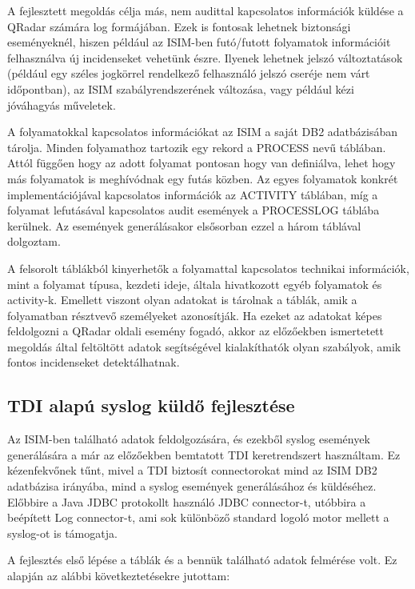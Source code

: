 A fejlesztett megoldás célja más, nem audittal kapcsolatos információk küldése a QRadar számára log formájában. Ezek is fontosak lehetnek biztonsági eseményeknél, hiszen például az ISIM-ben futó/futott folyamatok információit felhasználva új incidenseket vehetünk észre. Ilyenek lehetnek jelszó változtatások (például egy széles jogkörrel rendelkező felhasználó jelszó cseréje nem várt időpontban), az ISIM szabályrendszerének változása, vagy például kézi jóváhagyás műveletek. 

A folyamatokkal kapcsolatos információkat az ISIM a saját DB2 adatbázisában tárolja. Minden folyamathoz tartozik egy rekord a PROCESS nevű táblában. Attól függően hogy az adott folyamat pontosan hogy van definiálva, lehet hogy más folyamatok is meghívódnak egy futás közben. Az egyes folyamatok konkrét implementációjával kapcsolatos információk az ACTIVITY táblában, míg a folyamat lefutásával kapcsolatos audit események a PROCESSLOG táblába kerülnek. Az események generálásakor elsősorban ezzel a három táblával dolgoztam.

A felsorolt táblákból kinyerhetők a folyamattal kapcsolatos technikai információk, mint a folyamat típusa, kezdeti ideje, általa hivatkozott egyéb folyamatok és activity-k. Emellett viszont olyan adatokat is tárolnak a táblák, amik a folyamatban résztvevő személyeket azonosítják. Ha ezeket az adatokat képes feldolgozni a QRadar oldali esemény fogadó, akkor az előzőekben ismertetett megoldás által feltöltött adatok segítségével kialakíthatók olyan szabályok, amik fontos incidenseket detektálhatnak.
 
\subsection{TDI alapú syslog küldő fejlesztése}
Az ISIM-ben található adatok feldolgozására, és ezekből syslog események generálására a már az előzőekben bemtatott TDI keretrendszert használtam. Ez kézenfekvőnek tűnt, mivel a TDI biztosít connectorokat mind az ISIM DB2 adatbázisa irányába, mind a syslog események generálásához és küldéséhez. Előbbire a Java JDBC protokollt használó JDBC connector-t, utóbbira a beépített Log connector-t, ami sok különböző standard logoló motor mellett a syslog-ot is támogatja. 

A fejlesztés első lépése a táblák és a bennük található adatok felmérése volt. Ez alapján az alábbi következtetésekre jutottam:

